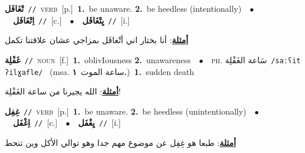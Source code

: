 \documentclass[10pt,a4paper,twoside]{article} %
\begin{document}
\begin{multicols}{2}
{\setlength\topsep{0pt}\textbf{\foreignlanguage{arabic}{تْغَافَل}}\ {\color{gray}\texttt{//}\color{black}}\ \textsc{verb}\ [p.]\ \textbf{1.}~be unaware.  \textbf{2.}~be heedless (intentionally)\ \ $\bullet$\ \ \setlength\topsep{0pt}\textbf{\foreignlanguage{arabic}{اِتْغَافَل}}\ {\color{gray}\texttt{//}\color{black}}\ [c.]\ \ $\bullet$\ \ \setlength\topsep{0pt}\textbf{\foreignlanguage{arabic}{يِتْغَافَل}}\ {\color{gray}\texttt{//}\color{black}}\ [i.]\  \begin{flushright}\color{gray}\foreignlanguage{arabic}{\textbf{\underline{\foreignlanguage{arabic}{أمثلة}}}: أنا بختار اني أتْغافَل بمزاجي عشان علاقتنا تكمل}\end{flushright}\color{black}} \vspace{2mm}

{\setlength\topsep{0pt}\textbf{\foreignlanguage{arabic}{غَفْلِة}}\ {\color{gray}\texttt{//}\color{black}}\ \textsc{noun}\ [f.]\ \textbf{1.}~oblivIousness  \textbf{2.}~unawareness\ \ $\bullet$\ \ \textsc{ph.} \color{gray} \foreignlanguage{arabic}{سَاعة الغَفْلِة}\color{black}\ {\color{gray}\texttt{/{\sffamily saːʕit ʔilɣafle}/}\color{black}}\ \color{gray} (msa. \foreignlanguage{arabic}{ساعة الموت}~\foreignlanguage{arabic}{\textbf{١.}})\color{black}\ \textbf{1.}~sudden death\  \begin{flushright}\color{gray}\foreignlanguage{arabic}{\textbf{\underline{\foreignlanguage{arabic}{أمثلة}}}: الله يجيرنا من ساعة الغَفْلِة!}\end{flushright}\color{black}} \vspace{2mm}

{\setlength\topsep{0pt}\textbf{\foreignlanguage{arabic}{غِفِل}}\ {\color{gray}\texttt{//}\color{black}}\ \textsc{verb}\ [p.]\ \textbf{1.}~be unaware.  \textbf{2.}~be heedless (unintentionally)\ \ $\bullet$\ \ \setlength\topsep{0pt}\textbf{\foreignlanguage{arabic}{اِغْفَل}}\ {\color{gray}\texttt{//}\color{black}}\ [c.]\ \ $\bullet$\ \ \setlength\topsep{0pt}\textbf{\foreignlanguage{arabic}{يِغْفَل}}\ {\color{gray}\texttt{//}\color{black}}\ [i.]\  \begin{flushright}\color{gray}\foreignlanguage{arabic}{\textbf{\underline{\foreignlanguage{arabic}{أمثلة}}}: طبعا هو غِفِل عن موضوع مهم جدا وهو توالي الأكل وين تنحط}\end{flushright}\color{black}} \vspace{2mm}


\end{multicols}
\end{document}

